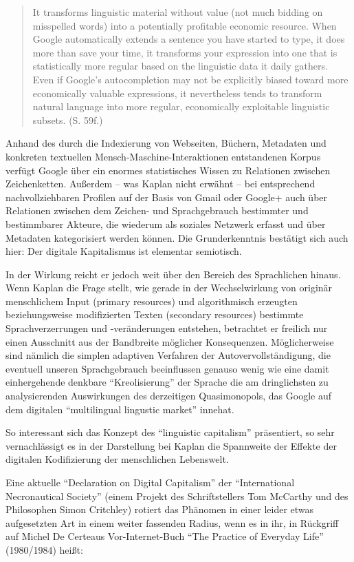 \documentclass[a4paper,
fontsize=11pt,
oneside,
numbers=noperiodatend,
parskip=half-,
bibliography=totoc,
final
]{scrartcl}
\begin{document}
\begin{quote}
It transforms linguistic material without value (not much bidding on
misspelled words) into a potentially profitable economic resource. When
Google automatically extends a sentence you have started to type, it
does more than save your time, it transforms your expression into one
that is statistically more regular based on the linguistic data it daily
gathers. Even if Google's autocompletion may not be explicitly biased
toward more economically valuable expressions, it nevertheless tends to
transform natural language into more regular, economically exploitable
linguistic subsets. (S. 59f.)
\end{quote}

Anhand des durch die Indexierung von Webseiten, Büchern, Metadaten und
konkreten textuellen Mensch-Maschine-Interaktionen entstandenen Korpus
verfügt Google über ein enormes statistisches Wissen zu Relationen
zwischen Zeichenketten. Außerdem -- was Kaplan nicht erwähnt -- bei
entsprechend nachvollziehbaren Profilen auf der Basis von Gmail oder
Google+ auch über Relationen zwischen dem Zeichen- und Sprachgebrauch
bestimmter und bestimmbarer Akteure, die wiederum als soziales Netzwerk
erfasst und über Metadaten kategorisiert werden können. Die
Grunderkenntnis bestätigt sich auch hier: Der digitale Kapitalismus ist
elementar semiotisch.

In der Wirkung reicht er jedoch weit über den Bereich des Sprachlichen
hinaus. Wenn Kaplan die Frage stellt, wie gerade in der Wechselwirkung
von originär menschlichem Input (primary resources) und algorithmisch
erzeugten beziehungsweise modifizierten Texten (secondary resources)
bestimmte Sprachverzerrungen und -veränderungen entstehen, betrachtet er
freilich nur einen Ausschnitt aus der Bandbreite möglicher Konsequenzen.
Möglicherweise sind nämlich die simplen adaptiven Verfahren der
Autovervollständigung, die eventuell unseren Sprachgebrauch beeinflussen
genauso wenig wie eine damit einhergehende denkbare
\enquote{Kreolisierung} der Sprache die am dringlichsten zu
analysierenden Auswirkungen des derzeitigen Quasimonopols, das Google
auf dem digitalen \enquote{multilingual lingustic market} innehat.

So interessant sich das Konzept des \enquote{linguistic capitalism}
präsentiert, so sehr vernachlässigt es in der Darstellung bei Kaplan die
Spannweite der Effekte der digitalen Kodifizierung der menschlichen
Lebenswelt.

Eine aktuelle \enquote{Declaration on Digital Capitalism} der
\enquote{International Necronautical Society} (einem Projekt des
Schriftstellers Tom McCarthy und des Philosophen Simon Critchley)
rotiert das Phänomen in einer leider etwas aufgesetzten Art in einem
weiter fassenden Radius, wenn es in ihr, in Rückgriff auf Michel De
Certeaus Vor-Internet-Buch \enquote{The Practice of Everyday Life}
(1980/1984) heißt:
\end{document}
